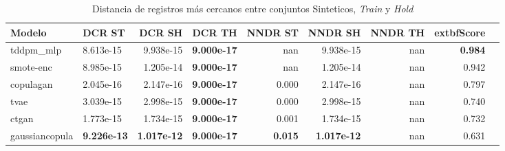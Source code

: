 \begin{table}[H]
\centering
\caption{Distancia de registros más cercanos entre conjuntos Sinteticos, \emph{Train} y \emph{Hold}}
\label{table-dcr-economicos-b-1}
\begin{tabular}{|l|l|r|r|r|r|r|r|r|}
\hline
\rowcolor[gray]{0.8}
Modelo & DCR ST & DCR SH & DCR TH & NNDR ST & NNDR SH & NNDR TH & 	extbf{Score} \\
\hline tddpm\_mlp & 8.613e-15 & 9.938e-15 & \cellcolor[rgb]{0.9, 0.54, 0.52} \bfseries 9.000e-17 & nan & 9.938e-15 & nan & \bfseries 0.984 \\
\hline smote-enc & 8.985e-15 & 1.205e-14 & \cellcolor[rgb]{0.9, 0.54, 0.52} \bfseries 9.000e-17 & nan & 1.205e-14 & nan & 0.942 \\
\hline copulagan & \cellcolor[rgb]{0.9, 0.54, 0.52} 2.045e-16 & \cellcolor[rgb]{0.9, 0.54, 0.52} 2.147e-16 & \cellcolor[rgb]{0.9, 0.54, 0.52} \bfseries 9.000e-17 & \cellcolor[rgb]{0.9, 0.54, 0.52} 0.000 & \cellcolor[rgb]{0.9, 0.54, 0.52} 2.147e-16 & nan & 0.797 \\
\hline tvae & 3.039e-15 & 2.998e-15 & \cellcolor[rgb]{0.9, 0.54, 0.52} \bfseries 9.000e-17 & 0.000 & 2.998e-15 & nan & 0.740 \\
\hline ctgan & 1.773e-15 & 1.734e-15 & \cellcolor[rgb]{0.9, 0.54, 0.52} \bfseries 9.000e-17 & 0.001 & 1.734e-15 & nan & 0.732 \\
\hline gaussiancopula & \bfseries 9.226e-13 & \bfseries 1.017e-12 & \cellcolor[rgb]{0.9, 0.54, 0.52} \bfseries 9.000e-17 & \bfseries 0.015 & \bfseries 1.017e-12 & nan & 0.631 \\
\hline
\end{tabular}
\end{table}

